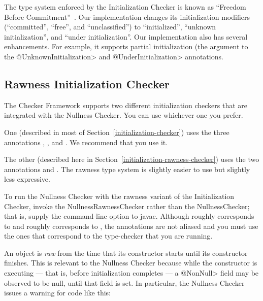 The type system enforced by the Initialization Checker is known as
``Freedom Before Commitment''~\cite{SummersM2011}.  Our implementation
changes its initialization modifiers (``committed'', ``free'', and
``unclassified'') to ``initialized'', ``unknown initialization'', and
``under initialization''.  Our implementation also has several
enhancements.  For example, it supports partial initialization (the
argument to the \<@UnknownInitialization> and \<@UnderInitialization>
annotations.



\subsection{Rawness Initialization Checker\label{initialization-rawness-checker}}

The Checker Framework supports two different initialization checkers that
are integrated with the Nullness Checker.
You can use whichever one you prefer.

One (described in most of Section~\ref{initialization-checker}) uses the three annotations
,
, and
.
We recommend that you use it.

The other (described here in Section~\ref{initialization-rawness-checker})
uses the two annotations
 and
.
The rawness type system is slightly easier to use but slightly less
expressive.

\begin{sloppypar}
To run the Nullness Checker with the rawness variant of the Initialization
Checker, invoke the NullnessRawnessChecker rather than the NullnessChecker;
that is, supply the 
command-line option to javac.
Although  roughly corresponds to 
and  roughly corresponds to , the
annotations are not aliased and you must use the ones that correspond to
the type-checker that you are running.
\end{sloppypar}





An object is
\emph{raw} from the time that its constructor starts until its constructor
finishes.  This is relevant to the Nullness Checker because while the
constructor is executing --- that is, before initialization completes ---
a \<@NonNull>
field may be observed to be null, until that field is set.  In
particular, the Nullness Checker issues a warning for code like this:

